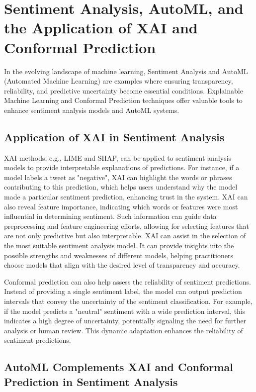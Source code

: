 \documentclass{article}
\begin{document}
\section{Sentiment Analysis, AutoML, and the Application of XAI and Conformal Prediction}

In the evolving landscape of machine learning, Sentiment Analysis and AutoML (Automated Machine Learning) are examples where ensuring transparency, reliability, and predictive uncertainty become essential conditions. Explainable Machine Learning and Conformal Prediction techniques offer valuable tools to enhance sentiment analysis models and AutoML systems.

\subsection{Application of XAI in Sentiment Analysis}

XAI methods, e.g., LIME and SHAP, can be applied to sentiment analysis models to provide interpretable explanations of predictions. For instance, if a model labels a tweet as "negative", XAI can highlight the words or phrases contributing to this prediction, which helps users understand why the model made a particular sentiment prediction, enhancing trust in the system. XAI can also reveal feature importance, indicating which words or features were most influential in determining sentiment. Such information can guide data preprocessing and feature engineering efforts, allowing for selecting features that are not only predictive but also interpretable. XAI can assist in the selection of the most suitable sentiment analysis model. It can provide insights into the possible strengths and weaknesses of different models, helping practitioners choose models that align with the desired level of transparency and accuracy.

Conformal prediction can also help assess the reliability of sentiment predictions. Instead of providing a single sentiment label, the model can output prediction intervals that convey the uncertainty of the sentiment classification. For example, if the model predicts a "neutral" sentiment with a wide prediction interval, this indicates a high degree of uncertainty, potentially signaling the need for further analysis or human review. This dynamic adaptation enhances the reliability of sentiment predictions.

\subsection{AutoML Complements XAI and Conformal Prediction in Sentiment Analysis}
\end{document}
